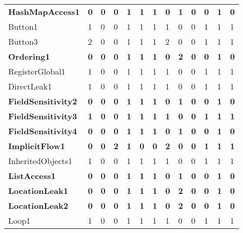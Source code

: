 \begin{table*}
\begin{small}
\begin{center}
{\begin{tabular}{|l||C{1.4cm}|C{1.4cm}|C{1.4cm}|C{1.4cm}|C{1.4cm}|C{1.4cm}||C{1.4cm}|C{1.4cm}|C{1.4cm}|C{1.4cm}|C{1.4cm}|C{1.4cm}|}
{\bf HashMapAccess1          }&{\bf  0  }&{\bf  0  }&{\bf  0  }&{\bf  1  }&{\bf  1  }&{\bf  1  }&{\bf  0  }&{\bf  1  }&{\bf  0  }&{\bf  0  }&{\bf  1  }&{\bf  0  }\\
Button1                 &  1  &  0  &  0  &  1  &  1  &  1  &  1  &  0  &  0  &  1  &  1  &  1  \\
Button3                 &  2  &  0  &  0  &  1  &  1  &  1  &  2  &  0  &  0  &  1  &  1  &  1  \\
{\bf Ordering1               }&{\bf  0  }&{\bf  0  }&{\bf  0  }&{\bf  1  }&{\bf  1  }&{\bf  1  }&{\bf  0  }&{\bf  2  }&{\bf  0  }&{\bf  0  }&{\bf  1  }&{\bf  0  }\\
RegisterGlobal1         &  1  &  0  &  0  &  1  &  1  &  1  &  1  &  0  &  0  &  1  &  1  &  1  \\
DirectLeak1             &  1  &  0  &  0  &  1  &  1  &  1  &  1  &  0  &  0  &  1  &  1  &  1  \\
{\bf FieldSensitivity2       }&{\bf  0  }&{\bf  0  }&{\bf  0  }&{\bf  1  }&{\bf  1  }&{\bf  1  }&{\bf  0  }&{\bf  1  }&{\bf  0  }&{\bf  0  }&{\bf  1  }&{\bf  0  }\\
{\bf FieldSensitivity3       }&{\bf  1  }&{\bf  0  }&{\bf  0  }&{\bf  1  }&{\bf  1  }&{\bf  1  }&{\bf  1  }&{\bf  0  }&{\bf  0  }&{\bf  1  }&{\bf  1  }&{\bf  1  }\\
{\bf FieldSensitivity4       }&{\bf  0  }&{\bf  0  }&{\bf  0  }&{\bf  1  }&{\bf  1  }&{\bf  1  }&{\bf  0  }&{\bf  1  }&{\bf  0  }&{\bf  0  }&{\bf  1  }&{\bf  0  }\\
{\bf ImplicitFlow1           }&{\bf  0  }&{\bf  0  }&{\bf  2  }&{\bf  1  }&{\bf  0  }&{\bf  0  }&{\bf  2  }&{\bf  0  }&{\bf  0  }&{\bf  1  }&{\bf  1  }&{\bf  1  }\\
InheritedObjects1       &  1  &  0  &  0  &  1  &  1  &  1  &  1  &  0  &  0  &  1  &  1  &  1  \\
{\bf ListAccess1             }&{\bf  0  }&{\bf  0  }&{\bf  0  }&{\bf  1  }&{\bf  1  }&{\bf  1  }&{\bf  0  }&{\bf  1  }&{\bf  0  }&{\bf  0  }&{\bf  1  }&{\bf  0  }\\
{\bf LocationLeak1           }&{\bf  0  }&{\bf  0  }&{\bf  0  }&{\bf  1  }&{\bf  1  }&{\bf  1  }&{\bf  0  }&{\bf  2  }&{\bf  0  }&{\bf  0  }&{\bf  1  }&{\bf  0  }\\
{\bf LocationLeak2           }&{\bf  0  }&{\bf  0  }&{\bf  0  }&{\bf  1  }&{\bf  1  }&{\bf  1  }&{\bf  0  }&{\bf  2  }&{\bf  0  }&{\bf  0  }&{\bf  1  }&{\bf  0  }\\
Loop1                   &  1  &  0  &  0  &  1  &  1  &  1  &  1  &  0  &  0  &  1  &  1  &  1  \\

\end{tabular}}
\end{center}
\end{small}
\end{table*}
